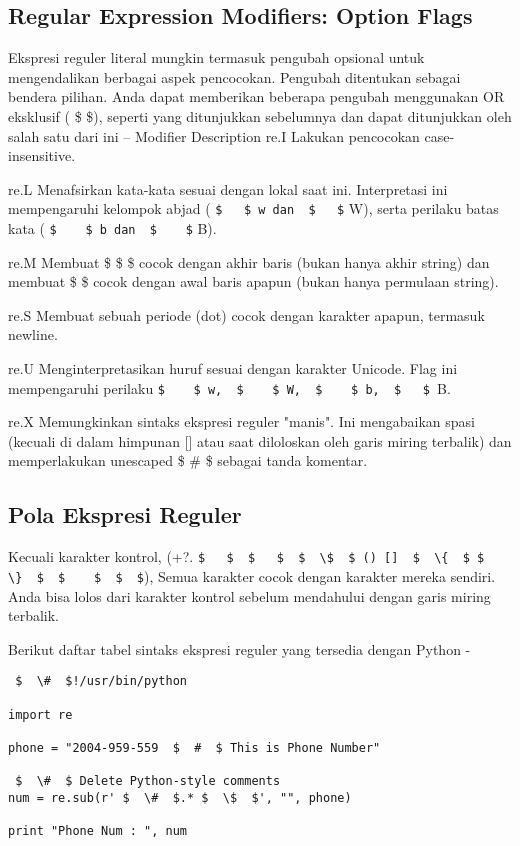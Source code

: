 \begin {enumerate}
\begin {enumerate}
\subsection{Regular Expression Modifiers: Option Flags}
Ekspresi reguler literal mungkin termasuk pengubah opsional untuk mengendalikan berbagai aspek pencocokan. Pengubah ditentukan sebagai bendera pilihan. Anda dapat memberikan beberapa pengubah menggunakan OR eksklusif ( \$   \$), seperti yang ditunjukkan sebelumnya dan dapat ditunjukkan oleh salah satu dari ini – Modifier Description
re.I
Lakukan pencocokan case-insensitive.

re.L
Menafsirkan kata-kata sesuai dengan lokal saat ini. Interpretasi ini mempengaruhi kelompok abjad ( \verb|$   $ w dan  $   $| W), serta perilaku batas kata ( \verb|$    $ b dan  $    $| B).

re.M
Membuat  \$  \$  \$ cocok dengan akhir baris (bukan hanya akhir string) dan membuat  \$   \$ cocok dengan awal baris apapun (bukan hanya permulaan string).

re.S
Membuat sebuah periode (dot) cocok dengan karakter apapun, termasuk newline.

re.U
Menginterpretasikan huruf sesuai dengan karakter Unicode. Flag ini mempengaruhi perilaku  \verb|$    $ w,  $    $ W,  $    $ b,  $   $ |B.

re.X
Memungkinkan sintaks ekspresi reguler "manis". Ini mengabaikan spasi (kecuali di dalam himpunan [] atau saat diloloskan oleh garis miring terbalik) dan memperlakukan unescaped  \$  \#  \$ sebagai tanda komentar.

\subsection{Pola Ekspresi Reguler}
Kecuali karakter kontrol, (+?.  \verb|$   $  $   $  $  \$  $ () []  $  \{  $ $  \}  $  $    $  $  $|), Semua karakter cocok dengan karakter mereka sendiri. Anda bisa lolos dari karakter kontrol sebelum mendahului dengan garis miring terbalik.

Berikut daftar tabel sintaks ekspresi reguler yang tersedia dengan Python -
\begin{verbatim}
 $  \#  $!/usr/bin/python

import re

phone = "2004-959-559  $  #  $ This is Phone Number"

 $  \#  $ Delete Python-style comments
num = re.sub(r' $  \#  $.* $  \$  $', "", phone)

print "Phone Num : ", num


\end{verbatim}
\end{enumerate}
\end{enumerate}
